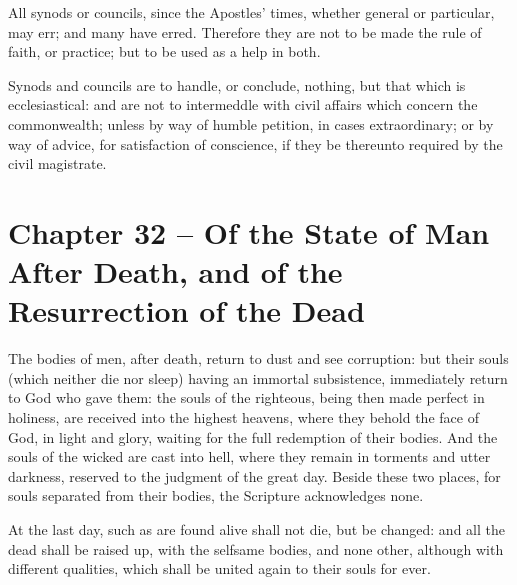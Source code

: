 \begin{outerlst}[left=0pt,labelsep=0pt]
\begin{innerlst}[resume*]
\item All synods or councils, since the Apostles{}' times, whether general or particular, may err; and many have erred. Therefore they are not to be made the rule of faith, or practice; but to be used as a help in both.   

\item Synods and councils are to handle, or conclude, nothing, but that which is ecclesiastical: and are not to intermeddle with civil affairs which concern the commonwealth; unless by way of humble petition, in cases extraordinary; or by way of advice, for satisfaction of conscience, if they be thereunto required by the civil magistrate.  
\end{innerlst}

\item
{}
\section{Chapter 32 -- Of the State of Man After Death, and of the Resurrection of the Dead}
\begin{innerlst}[resume*]

\item The bodies of men, after death, return to dust and see corruption: but their souls (which neither die nor sleep) having an immortal subsistence, immediately return to God who gave them: the souls of the righteous, being then made perfect in holiness, are received into the highest heavens, where they behold the face of God, in light and glory, waiting for the full redemption of their bodies. And the souls of the wicked are cast into hell, where they remain in torments and utter darkness, reserved to the judgment of the great day. Beside these two places, for souls separated from their bodies, the Scripture acknowledges none.   

\item At the last day, such as are found alive shall not die, but be changed: and all the dead shall be raised up, with the selfsame bodies, and none other, although with different qualities, which shall be united again to their souls for ever.   


\end{innerlst}
\end{outerlst}
